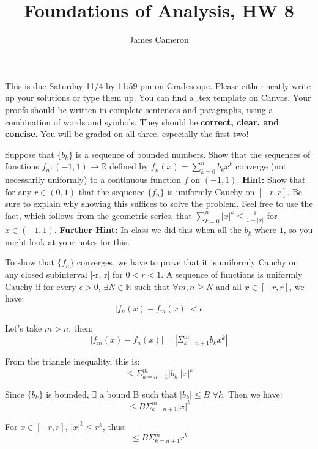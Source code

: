 \documentclass[answers]{exam}
\title{Foundations of Analysis, HW 8}
\author{James Cameron}
\date{}
\theoremstyle{remark}
\theoremstyle{definition}
\newcommand{\NN}{\mathbb{N}}
\newcommand{\RR}{\mathbb{R}}
\begin{document}



 This is due Saturday 11/4 by 11:59 pm on Gradescope. Please either neatly write up your solutions or type them up. You can find a .tex template on Canvas. Your proofs should be written in complete sentences and paragraphs, using a combination of words and symbols. They should be \textbf{correct, clear, and concise}. You will be graded on all three, especially the first two!

\noindent


\begin{questions}

\question[4] Suppose that $\{b_k\}$ is a sequence of bounded numbers. Show that the sequences of functions $f_n:(-1,1) \to \RR$ defined by $f_n(x)= \sum_{k=0}^n b_kx^k$ converge (not necessarily uniformly) to a continuous function $f$ on $(-1,1)$. \textbf{Hint:} Show that for any $r \in (0,1)$ that the sequence $\{f_n\}$ is uniformly Cauchy on $[-r,r]$. Be sure to explain why showing this suffices to solve the problem. Feel free to use the fact, which follows from the geometric series, that $\sum_{k=0}^n |x|^k \le \frac{1}{1-|x|}$ for $x \in (-1,1)$. \textbf{Further Hint:} In class we did this when all the $b_k$ where $1$, so you might look at your notes for this.
\begin{solution}

To show that $\{f_n\}$ converges, we have to prove that it is uniformly Cauchy
on any closed subinterval [-r, r] for $0 < r < 1$. A sequence of functions
is uniformly Cauchy if for every $\epsilon > 0$, $\exists N \in \NN$ such that
$\forall m, n \geq N$ and all $x \in [-r, r]$, we have:
\[|f_n(x) - f_m(x)| < \epsilon\]

Let's take $m > n$, then:
\[|f_m(x) - f_n(x)| = |\Sigma_{k = n+1}^m b_k x^k|\]

From the triangle inequality, this is:
\[\leq \Sigma_{k=n+1}^m |b_k||x|^k\]

Since $\{b_k\}$ is bounded, $\exists$ a bound B such that
$|b_k| \leq B$ $\forall k$. Then we have:
\[\leq B \Sigma_{k=n+1}^m |x|^k\]

For $x \in [-r, r]$, $|x|^k \leq r^k$, thus:
\[\leq B \Sigma_{k=n+1}^m r^k\]


\end{solution}
\end{questions}
\end{document}
